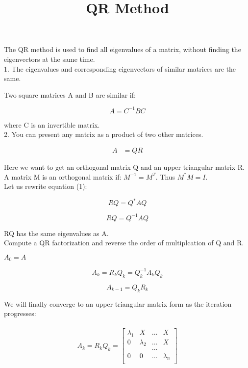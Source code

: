\documentclass{article}
\title{QR Method}
\begin{document}
  \maketitle
  \newpage

The QR method is used to find all eigenvalues of a matrix, without finding the eigenvectors at the same time.\\

1. The eigenvalues and corresponding eigenvectors of similar matrices are the same.

Two square matrices A and B are similar if:

$$A = C^{-1}BC$$

where C is an invertible matrix.\\

2. You can present any matrix as a product of two other matrices. 

\begin{align}
A &= QR
\end{align}

Here we want to get an orthogonal matrix Q and an upper triangular matrix R.\\

A matrix M is an orthogonal matrix if: $M^{-1} = M^T$. Thus $M^*M = I$. \\

Let us rewrite equation (1):

$$RQ = Q^*AQ$$

$$RQ = Q^{-1}AQ$$ 

RQ has the same eigenvalues as A.\\

Compute a QR factorization and reverse the order of multiplcation of Q and R.

$A_0 = A$

$$A_k = R_kQ_k = Q^{-1}_kA_kQ_k$$

$$A_{k-1}=Q_kR_k$$

We will finally converge to an upper triangular matrix form as the iteration progresses:

\begin{align*}
\begin{split} A_k = R_kQ_k = \begin{bmatrix}
\lambda_1 & X & \dots & X\\
0 & \lambda_2 & \dots & X\\
& &\dots &\\
0 & 0 & \dots & \lambda_n\\
\end{bmatrix}\end{split}
\end{align*}
\end{document}
